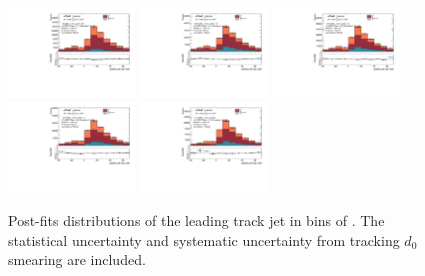 \begin{figure}[htbp]
  \centering
 \includegraphics[width=0.3\textwidth]{figures/gbb/Sub_Sd0_Fits/Canv_Fit_-3-logM_bb_over_p_TG--22_coarse_x.pdf}
 \includegraphics[width=0.3\textwidth]{figures/gbb/Sub_Sd0_Fits/Canv_Fit_-22-logM_bb_over_p_TG--19_coarse_x.pdf}
 \includegraphics[width=0.3\textwidth]{figures/gbb/Sub_Sd0_Fits/Canv_Fit_-19-logM_bb_over_p_TG--15_coarse_x.pdf}\\
 \includegraphics[width=0.3\textwidth]{figures/gbb/Sub_Sd0_Fits/Canv_Fit_-15-logM_bb_over_p_TG--11_coarse_x.pdf}
 \includegraphics[width=0.3\textwidth]{figures/gbb/Sub_Sd0_Fits/Canv_Fit_-11-logM_bb_over_p_TG-0_coarse_x.pdf}


\caption{Post-fits \subsdzero distributions of the leading track jet in bins of \mpt. The statistical uncertainty and systematic uncertainty from tracking $d_0$ smearing are included.}
  \label{fig:fracmasspt-postfits-leading-sub}
\end{figure}


